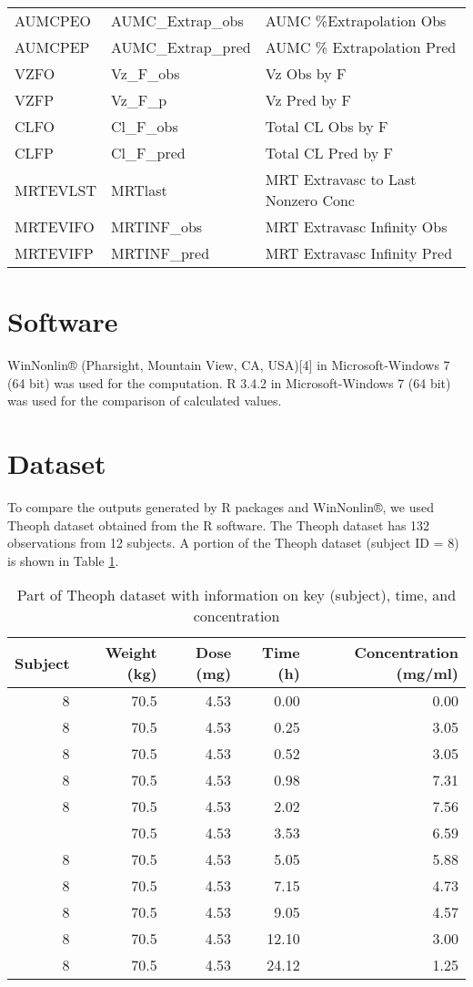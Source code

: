 \documentclass[12pt,]{krantz}
\theoremstyle{definition}
\theoremstyle{definition}
\theoremstyle{definition}
\theoremstyle{remark}
\begin{document}
\begin{longtable}[t]{lll}
AUMCPEO & AUMC\_Extrap\_obs & AUMC \%Extrapolation Obs\\
AUMCPEP & AUMC\_Extrap\_pred & AUMC \% Extrapolation Pred\\
VZFO & Vz\_F\_obs & Vz Obs by F\\
\addlinespace
VZFP & Vz\_F\_p & Vz Pred by F\\
CLFO & Cl\_F\_obs & Total CL Obs by F\\
CLFP & Cl\_F\_pred & Total CL Pred by F\\
MRTEVLST & MRTlast & MRT Extravasc to Last Nonzero Conc\\
MRTEVIFO & MRTINF\_obs & MRT Extravasc Infinity Obs\\
MRTEVIFP & MRTINF\_pred & MRT Extravasc Infinity Pred\\
\bottomrule
\end{longtable}

\hypertarget{software}{%
\section{Software}\label{software}}

WinNonlin® (Pharsight, Mountain View, CA, USA){[}4{]} in
Microsoft-Windows 7 (64 bit) was used for the computation. R 3.4.2 in
Microsoft-Windows 7 (64 bit) was used for the comparison of calculated
values.

\hypertarget{dataset}{%
\section{Dataset}\label{dataset}}

To compare the outputs generated by R packages and WinNonlin®, we used
Theoph dataset obtained from the R software. The Theoph dataset has 132
observations from 12 subjects. A portion of the Theoph dataset (subject
ID = 8) is shown in Table \ref{tab:table2}.

\begin{table}

\caption{\label{tab:table2}Part of Theoph dataset with information on key (subject), time, and concentration}
\centering
\begin{tabular}[t]{rrrrr}
\toprule
Subject & Weight (kg) & Dose (mg) & Time (h) & Concentration (mg/ml)\\
\midrule
8 & 70.5 & 4.53 & 0.00 & 0.00\\
8 & 70.5 & 4.53 & 0.25 & 3.05\\
8 & 70.5 & 4.53 & 0.52 & 3.05\\
8 & 70.5 & 4.53 & 0.98 & 7.31\\
8 & 70.5 & 4.53 & 2.02 & 7.56\\
\addlinespace
8 & 70.5 & 4.53 & 3.53 & 6.59\\
8 & 70.5 & 4.53 & 5.05 & 5.88\\
8 & 70.5 & 4.53 & 7.15 & 4.73\\
8 & 70.5 & 4.53 & 9.05 & 4.57\\
8 & 70.5 & 4.53 & 12.10 & 3.00\\
8 & 70.5 & 4.53 & 24.12 & 1.25\\
\bottomrule
\end{tabular}
\end{table}
\end{document}
